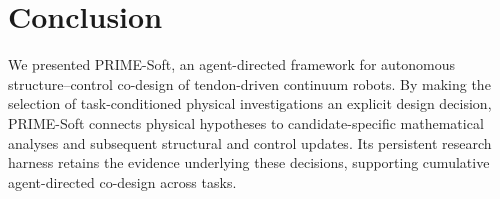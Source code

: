 \section{Conclusion}
\label{sec:conclusion}

We presented PRIME-Soft, an agent-directed framework for autonomous structure--control co-design of tendon-driven continuum robots. By making the selection of task-conditioned physical investigations an explicit design decision, PRIME-Soft connects physical hypotheses to candidate-specific mathematical analyses and subsequent structural and control updates. Its persistent research harness retains the evidence underlying these decisions, supporting cumulative agent-directed co-design across tasks.
